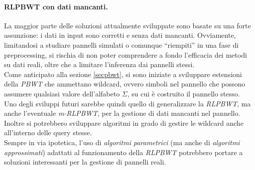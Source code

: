 \paragraph{RLPBWT con dati mancanti.}
La maggior parte delle soluzioni attualmente sviluppate sono basate su una forte
assunzione: i dati in input sono corretti e senza dati mancanti. Ovviamente,
limitandosi a studiare pannelli simulati o comunque ``riempiti'' in una fase di
preprocessing, si rischia di non poter comprendere a fondo l'efficacia dei
metodi su dati reali, oltre che a limitare l'inferenza dai pannelli stessi.\\
Come anticipato alla sezione \ref{secpbwt}, si sono iniziate a sviluppare
estensioni della \textit{PBWT} che ammettano wildcard, ovvero simboli nel
pannello che possono assumere qualsiasi valore dell'alfabeto $\Sigma$, su cui è
costruito il pannello stesso.\\
Uno degli sviluppi futuri sarebbe quindi quello di generalizzare la
\textit{RLPBWT}, ma anche l'eventuale \textit{m-RLPBWT}, per la gestione di dati
mancanti nel pannello. Inoltre si potrebbero sviluppare algoritmi in grado di
gestire le wildcard anche all'interno delle query stesse.\\
Sempre in via ipotetica, l'uso di \textit{algoritmi parametrici} (ma anche
di \textit{algoritmi approssimati}) adattati al
funzionamento della \textit{RLPBWT} potrebbero portare a soluzioni interessanti
per la gestione di pannelli reali.
